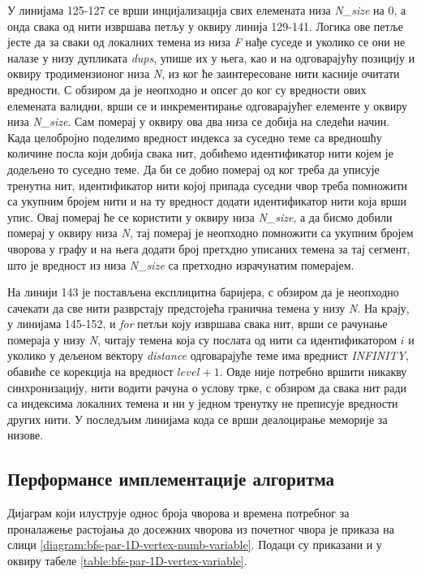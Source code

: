 \par
У линијама 125-127 се врши инцијализација свих елемената низа \textit{N\_size} на $0$, а онда свака од нити извршава петљу у оквиру линија 129-141. Логика ове петље јесте да за сваки од локалних темена из низа \textit{F} нађе суседе и уколико се они не налазе у низу дупликата \textit{dups}, упише их у њега, као и на одговарајућу позицију и оквиру тродимензионог низа \textit{N}, из ког ће заинтересоване нити касније очитати вредности. С обзиром да је неопходно и опсег до ког су вредности ових елемената валидни, врши се и инкрементирање одговарајућег елементе у оквиру низа \textit{N\_size}. Сам померај у оквиру ова два низа се добија на следећи начин. Када целобројно поделимо вредност индекса за суседно теме са вредношћу количине посла који добија свака нит, добићемо идентификатор нити којем је додељено то суседно теме. Да би се добио померај од ког треба да уписује тренутна нит, идентификатор нити којој припада суседни чвор треба помножити са укупним бројем нити и на ту вредност додати идентификатор нити која врши упис. Овај померај ће се користити у оквиру низа \textit{N\_size}, а да бисмо добили померај у оквиру низа \textit{N}, тај померај је неопходно помножити са укупним бројем чворова у графу и на њега додати број претхдно уписаних темена за тај сегмент, што је вредност из низа \textit{N\_size} са претходно израчунатим померајем.

\par
На линији 143 је постављена експлицитна баријера, с обзиром да је неопходно сачекати да све нити разврстају предстојећа гранична темена у низу \textit{N}. На крају, у линијама 145-152, и \textit{for} петљи коју извршава свака нит, врши се рачунање помераја у низу \textit{N}, читају темена која су послата од нити са идентификатором $i$ и уколико у дељеном вектору \textit{distance} одговарајуће теме има вреднист \textit{INFINITY}, обавиће се корекција на вредност $\textit{level} + 1$. Овде није потребно вршити никакву синхронизацију, нити водити рачуна о услову трке, с обзиром да свака нит ради са индексима локалних темена и ни у једном тренутку не преписује вредности других нити. У последљим линијама кода се врши деалоцирање меморије за низове.

\subsection{Перформансе имплементације алгоритма}
Дијаграм који илуструје однос броја чворова и времена потребног за проналажење растојања до досежних чворова из почетног чвора је приказа на слици \ref{diagram:bfs-par-1D-vertex-numb-variable}. Подаци су приказани и у оквиру табеле \ref{table:bfs-par-1D-vertex-variable}.

